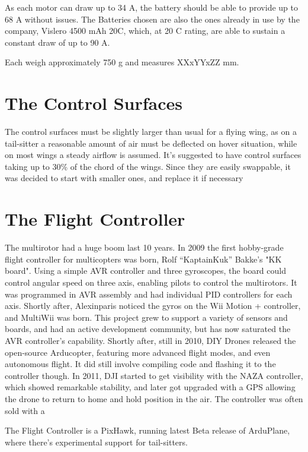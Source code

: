 As each motor can draw up to 34 A, the battery should be able to provide up to 68 A without issues.
The Batteries chosen are also the ones already in use by the company, Vislero 4500 mAh 20C, which, at 20 C rating, are able to sustain a constant draw of up to 90 A. 

Each weigh approximately 750 g and measures XXxYYxZZ mm.

\section{The Control Surfaces}

The control surfaces must be slightly larger than usual for a flying wing, as on a tail-sitter a reasonable amount of air must be deflected on hover situation, while on most wings a steady airflow is assumed. It's suggested to have control surfaces taking up to 30\% of the chord of the wings. Since they are easily swappable, it was decided to start with smaller ones, and replace it if necessary

\section{The Flight Controller}

The multirotor had a huge boom last 10 years. In 2009 the first hobby-grade flight controller for multicopters was born, Rolf “KaptainKuk” Bakke's "KK board". Using a simple AVR controller and three gyroscopes, the board could control angular speed on three axis, enabling pilots to control the multirotors. It was programmed in AVR assembly and had individual PID controllers for each axis.
%
Shortly after, Alexinparis noticed the gyros on the Wii Motion + controller, and MultiWii was born. This project grew to support a variety of sensors and boards, and had an active development community, but has now saturated the AVR controller's capability.
%
Shortly after, still in 2010, DIY Drones released the open-source Arducopter, featuring more advanced flight modes, and even autonomous flight.  It did still involve compiling code and flashing it to the controller though.
%
In 2011, DJI started to get visibility with the NAZA controller, which showed remarkable stability, and later got upgraded with a GPS allowing the drone to return to home and hold position in the air. The controller was often sold with a 





The Flight Controller is a PixHawk, running latest Beta release of ArduPlane, where there's experimental support for tail-sitters.


